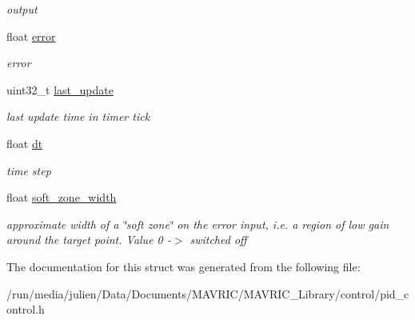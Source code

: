 \begin{DoxyCompactItemize}
\begin{DoxyCompactList}\small\item\em output \end{DoxyCompactList}\item 
\hypertarget{structpid__controller__t_a8ed90ee7713408394747f92385718212}{float \hyperlink{structpid__controller__t_a8ed90ee7713408394747f92385718212}{error}}\label{structpid__controller__t_a8ed90ee7713408394747f92385718212}

\begin{DoxyCompactList}\small\item\em error \end{DoxyCompactList}\item 
\hypertarget{structpid__controller__t_a7fe3e6bae7b9ef2fd628504a9b51aa8a}{uint32\+\_\+t \hyperlink{structpid__controller__t_a7fe3e6bae7b9ef2fd628504a9b51aa8a}{last\+\_\+update}}\label{structpid__controller__t_a7fe3e6bae7b9ef2fd628504a9b51aa8a}

\begin{DoxyCompactList}\small\item\em last update time in timer tick \end{DoxyCompactList}\item 
\hypertarget{structpid__controller__t_aa2df2d01c5028cce7276d9ab7df89024}{float \hyperlink{structpid__controller__t_aa2df2d01c5028cce7276d9ab7df89024}{dt}}\label{structpid__controller__t_aa2df2d01c5028cce7276d9ab7df89024}

\begin{DoxyCompactList}\small\item\em time step \end{DoxyCompactList}\item 
\hypertarget{structpid__controller__t_a5a63d05e58a79340c0222c8acfaca962}{float \hyperlink{structpid__controller__t_a5a63d05e58a79340c0222c8acfaca962}{soft\+\_\+zone\+\_\+width}}\label{structpid__controller__t_a5a63d05e58a79340c0222c8acfaca962}

\begin{DoxyCompactList}\small\item\em approximate width of a \char`\"{}soft zone\char`\"{} on the error input, i.\+e. a region of low gain around the target point. Value 0 -\/$>$ switched off \end{DoxyCompactList}\end{DoxyCompactItemize}


The documentation for this struct was generated from the following file\+:\begin{DoxyCompactItemize}
\item 
/run/media/julien/\+Data/\+Documents/\+M\+A\+V\+R\+I\+C/\+M\+A\+V\+R\+I\+C\+\_\+\+Library/control/pid\+\_\+control.\+h\end{DoxyCompactItemize}
